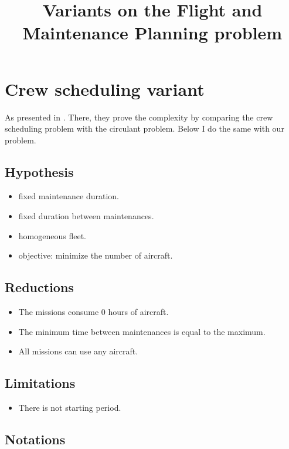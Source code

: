 \documentclass[a4paper,11pt]{article}
\title{Variants on the Flight and Maintenance Planning problem}
\author{}
\begin{document}
\maketitle

\section{Crew scheduling variant}

    As presented in \cite{Brunner2013}. There, they prove the complexity by comparing the crew scheduling problem with the circulant problem. Below I do the same with our problem.

    \subsection{Hypothesis}

    \begin{itemize}
     \item fixed maintenance duration.
     \item fixed duration between maintenances.
     \item homogeneous fleet.
     \item objective: minimize the number of aircraft.
    \end{itemize}

    \subsection{Reductions}

    \begin{itemize}
        \item The missions consume 0 hours of aircraft.
        \item The minimum time between maintenances is equal to the maximum.
        \item All missions can use any aircraft.
    \end{itemize}

    \subsection{Limitations}

    \begin{itemize}
        \item There is not starting period.
    \end{itemize}

    \subsection{Notations}
\end{document}
